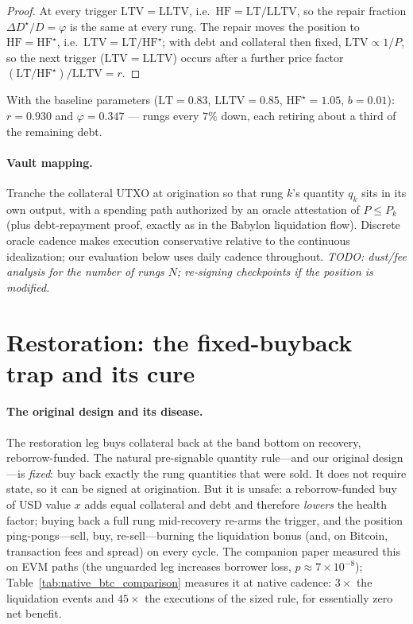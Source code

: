 \documentclass[12pt]{article}
\begin{document}
\begin{proof}
At every trigger $\mathrm{LTV}=\mathrm{LLTV}$, i.e.\
$\mathrm{HF}=\mathrm{LT}/\mathrm{LLTV}$, so the repair fraction
$\Delta D^{\star}/D = \varphi$ is the same at every rung. The repair moves the
position to $\mathrm{HF}=\mathrm{HF}^{\star}$, i.e.\
$\mathrm{LTV}=\mathrm{LT}/\mathrm{HF}^{\star}$; with debt and collateral then
fixed, $\mathrm{LTV}\propto 1/P$, so the next trigger
($\mathrm{LTV}=\mathrm{LLTV}$) occurs after a further price factor
$(\mathrm{LT}/\mathrm{HF}^{\star})/\mathrm{LLTV} = r$.
\end{proof}

With the baseline parameters ($\mathrm{LT}=0.83$, $\mathrm{LLTV}=0.85$,
$\mathrm{HF}^{\star}=1.05$, $b=0.01$): $r = 0.930$ and $\varphi = 0.347$ ---
rungs every $7\%$ down, each retiring about a third of the remaining debt.

\paragraph{Vault mapping.} Tranche the collateral UTXO at origination so that
rung $k$'s quantity $q_k$ sits in its own output, with a spending path
authorized by an oracle attestation of $P \le P_k$ (plus debt-repayment proof,
exactly as in the Babylon liquidation flow). Discrete oracle cadence makes
execution conservative relative to the continuous idealization; our evaluation
below uses daily cadence throughout. \emph{TODO: dust/fee analysis for the
number of rungs $N$; re-signing checkpoints if the position is modified.}

\section{Restoration: the fixed-buyback trap and its cure}
\label{sec:restoration}

\paragraph{The original design and its disease.} The restoration leg buys
collateral back at the band bottom on recovery, reborrow-funded. The natural
pre-signable quantity rule---and our original design---is \emph{fixed}: buy
back exactly the rung quantities that were sold. It does not require state,
so it can be signed at origination. But it is unsafe: a reborrow-funded buy
of USD value $x$ adds equal collateral and debt and therefore \emph{lowers}
the health factor; buying back a full rung mid-recovery re-arms the trigger,
and the position ping-pongs---sell, buy, re-sell---burning the liquidation
bonus (and, on Bitcoin, transaction fees and spread) on every cycle. The
companion paper measured this on EVM paths (the unguarded leg increases
borrower loss, $p\approx 7\times10^{-8}$); Table~\ref{tab:native_btc_comparison}
measures it at native cadence: $3\times$ the liquidation events and $45\times$
the executions of the sized rule, for essentially zero net benefit.
\end{document}
